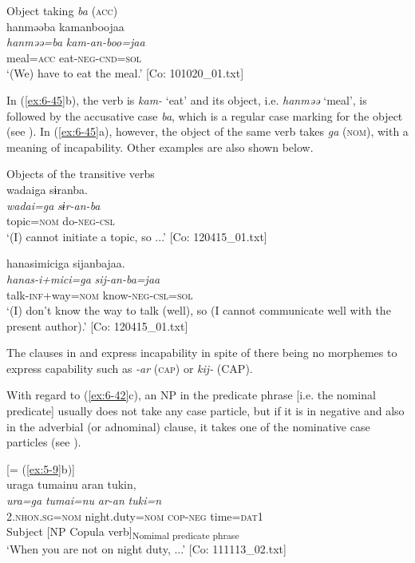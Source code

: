\ex Object taking \textit{ba} (\textsc{acc})\\
{\TM}
\glll  hanməəba  kamanboojaa\\
\textit{hanməə=ba}  \textit{kam-an-boo=jaa}\\
meal=\textsc{acc}  eat-\textsc{neg}-\textsc{cnd}=\textsc{sol}\\
\glt ‘(We) have to eat the meal.’ [Co: 101020\_01.txt]
\z
\z

In (\ref{ex:6-45}b), the verb is \textit{kam-} ‘eat’ and its object, i.e. \textit{hanməə} ‘meal’, is followed by the accusative case \textit{ba}, which is a regular case marking for the object (see ). In (\ref{ex:6-45}a), however, the object of the same verb takes \textit{ga} (\textsc{nom}), with a meaning of incapability. Other examples are also shown below.

\ea\label{ex:6-46}
 Objects of the transitive verbs\\

\ea
{\TM}
\glll {\textbar}wadai{\textbar}ga  sɨranba.\\
\textit{wadai=ga}  \textit{sɨr-an-ba}\\
topic=\textsc{nom}  do-\textsc{neg}-\textsc{csl}\\
\glt ‘(I) cannot initiate a topic, so ...’ [Co: 120415\_01.txt]

\ex
{\TM}
\glll hanasimiciga  sijanbajaa.\\
\textit{hanas-i+mici=ga}  \textit{sij-an-ba=jaa}\\
talk-\textsc{inf}+way=\textsc{nom}  know-\textsc{neg}-\textsc{csl}=\textsc{sol}\\
\glt ‘(I) don’t know the way to talk (well), so (I cannot communicate well with the present author).’ [Co: 120415\_01.txt]
\z
\z

The clauses in  and  express incapability in spite of there being no morphemes to express capability such as \textit{-ar} (\textsc{cap}) or \textit{kij-} (CAP).

  With regard to (\ref{ex:6-42}c), an NP in the predicate phrase [i.e. the nominal predicate] usually does not take any case particle, but if it is in negative and also in the adverbial (or adnominal) clause, it takes one of the nominative case particles (see ).

\ea\label{ex:6-47}
 [= (\ref{ex:5-9}b)]\\
{\TM}
\gllll uraga  tumainu  aran  tukin,\\
\textit{ura=ga}  \textit{tumai=nu}  \textit{ar-an}  \textit{tuki=n}\\
    2.\textsc{nhon}.\textsc{sg}=\textsc{nom}  night.duty=\textsc{nom}  \textsc{cop}-\textsc{neg}  time=\textsc{dat}1\\
    Subject  [NP  Copula verb]\textsubscript{Nomimal predicate phrase}  \\
\glt    ‘When you are not on night duty, ...’ [Co: 111113\_02.txt]
\z

